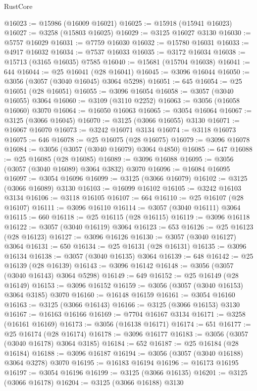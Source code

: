 \begin{lexlean}{RustCore}
\begin{coremodule}
@16023 := @15986 (@16009 @16021)
@16025 := @15918 (@15941 @16023)
@16027 := @3258 (@15803 @16025)
@16029 := @3125 @16027 @3130
@16030 := @5757 @16029
@16031 := @7759 @16030
@16032 := @15780 @16031
@16033 := @4917 @16032
@16034 := @7537 @16033
@16035 := @3172 @16034
@16038 := @15713 (@3165 @16035) @7585
@16040 := @15681 (@15704 @16038)
@16041 := 644
@16044 := @25 @16041 (@28 @16041)
@16045 := @3096 @16044
@16050 := @3056 (@3057 (@3040 @16045) @3064 @5298)
@16051 := 645
@16054 := @25 @16051 (@28 @16051)
@16055 := @3096 @16054
@16058 := @3057 (@3040 @16055) @3064
@16060 := @3109 (@3110 @2252)
@16063 := @3056 (@16058 @16060) @3070
@16064 := @16050 @16063
@16065 := @3054 @16064
@16067 := @3125 (@3066 @16045)
@16070 := @3125 (@3066 @16055) @3130
@16071 := @16067 @16070
@16073 := @3242 @16071 @3134
@16074 := @3118 @16073
@16075 := 646
@16078 := @25 @16075 (@28 @16075)
@16079 := @3096 @16078
@16084 := @3056 (@3057 (@3040 @16079) @3064 @4850)
@16085 := 647
@16088 := @25 @16085 (@28 @16085)
@16089 := @3096 @16088
@16095 := @3056 (@3057 (@3040 @16089) @3064 @3832) @3070
@16096 := @16084 @16095
@16097 := @3054 @16096
@16099 := @3125 (@3066 @16079)
@16102 := @3125 (@3066 @16089) @3130
@16103 := @16099 @16102
@16105 := @3242 @16103 @3134
@16106 := @3118 @16105
@16107 := 664
@16110 := @25 @16107 (@28 @16107)
@16111 := @3096 @16110
@16114 := @3057 (@3040 @16111) @3064
@16115 := 660
@16118 := @25 @16115 (@28 @16115)
@16119 := @3096 @16118
@16122 := @3057 (@3040 @16119) @3064
@16123 := 653
@16126 := @25 @16123 (@28 @16123)
@16127 := @3096 @16126
@16130 := @3057 (@3040 @16127) @3064
@16131 := 650
@16134 := @25 @16131 (@28 @16131)
@16135 := @3096 @16134
@16138 := @3057 (@3040 @16135) @3064
@16139 := 648
@16142 := @25 @16139 (@28 @16139)
@16143 := @3096 @16142
@16148 := @3056 (@3057 (@3040 @16143) @3064 @5298)
@16149 := 649
@16152 := @25 @16149 (@28 @16149)
@16153 := @3096 @16152
@16159 := @3056 (@3057 (@3040 @16153) @3064 @3185) @3070
@16160 := @16148 @16159
@16161 := @3054 @16160
@16163 := @3125 (@3066 @16143)
@16166 := @3125 (@3066 @16153) @3130
@16167 := @16163 @16166
@16169 := @7704 @16167 @3134
@16171 := @3258 (@16161 @16169)
@16173 := @3056 (@16138 @16171)
@16174 := 651
@16177 := @25 @16174 (@28 @16174)
@16178 := @3096 @16177
@16183 := @3056 (@3057 (@3040 @16178) @3064 @3185)
@16184 := 652
@16187 := @25 @16184 (@28 @16184)
@16188 := @3096 @16187
@16194 := @3056 (@3057 (@3040 @16188) @3064 @3278) @3070
@16195 := @16183 @16194
@16196 := @16173 @16195
@16197 := @3054 @16196
@16199 := @3125 (@3066 @16135)
@16201 := @3125 (@3066 @16178)
@16204 := @3125 (@3066 @16188) @3130

\end{coremodule}
\end{lexlean}
